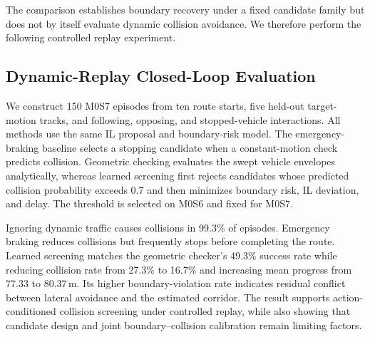 The comparison establishes boundary recovery under a fixed candidate family but does not by itself evaluate dynamic collision avoidance. We therefore perform the following controlled replay experiment.

\subsection{Dynamic-Replay Closed-Loop Evaluation}
\label{sec:dynamic_closed_loop}

We construct 150 M0S7 episodes from ten route starts, five held-out target-motion tracks, and following, opposing, and stopped-vehicle interactions. All methods use the same IL proposal and boundary-risk model. The emergency-braking baseline selects a stopping candidate when a constant-motion check predicts collision. Geometric checking evaluates the swept vehicle envelopes analytically, whereas learned screening first rejects candidates whose predicted collision probability exceeds 0.7 and then minimizes boundary risk, IL deviation, and delay. The threshold is selected on M0S6 and fixed for M0S7.

\begin{table}[t]
\centering
\caption{Controlled dynamic-replay closed-loop results on 150 M0S7 episodes.}
\label{tab:dynamic_closed_loop}
\end{table}

Ignoring dynamic traffic causes collisions in 99.3\% of episodes. Emergency braking reduces collisions but frequently stops before completing the route. Learned screening matches the geometric checker's 49.3\% success rate while reducing collision rate from 27.3\% to 16.7\% and increasing mean progress from 77.33 to 80.37\,m. Its higher boundary-violation rate indicates residual conflict between lateral avoidance and the estimated corridor. The result supports action-conditioned collision screening under controlled replay, while also showing that candidate design and joint boundary--collision calibration remain limiting factors.

